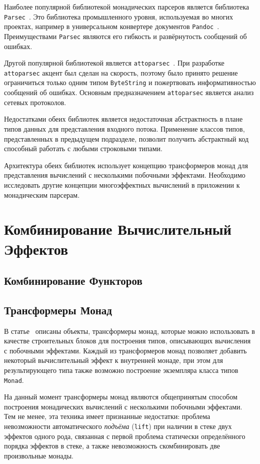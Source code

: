 Наиболее популярной библиотекой монадических парсеров является библиотека \lstinline{Parsec}~\autocite{Parsec}. Это библиотека промышленного уровня, используемая во многих проектах, например в универсальном конвертере документов \lstinline{Pandoc}~\autocite{Pandoc}. Преимуществами \lstinline{Parsec} являются его гибкость и развёрнутость сообщений об ошибках.

Другой популярной библиотекой является \lstinline{attoparsec}~\autocite{Attoparsec}. При разработке \lstinline{attoparsec} акцент был сделан на скорость, поэтому было принято решение ограничиться только одним типом \lstinline{ByteString} и пожертвовать информативностью сообщений об ошибках. Основным предназначением \lstinline{attoparsec} является анализ сетевых протоколов.

Недостатками обеих библиотек является недостаточная абстрактность в плане типов данных для представления входного потока. Применение классов типов, представленных в предыдущем подразделе, позволит получить абстрактный код способный работать с любыми строковыми типами.   

Архитектура обеих библиотек использует концепцию трансформеров монад для представления вычислений с несколькими побочными эффектами. Необходимо исследовать другие концепции многоэффектных вычислений в приложении к монадическим парсерам. 

\section{Комбинирование Вычислительный Эффектов}

\subsection{Комбинирование Функторов}

\subsection{Трансформеры Монад}

В статье~\autocite{MonadTransformers} описаны объекты, трансформеры монад, которые можно использовать в качестве строительных блоков для построения типов, описывающих вычисления с побочными эффектами. Каждый из трансформеров монад позволяет добавить некоторый вычислительный эффект к внутренней монаде, при этом для результирующего типа также возможно построение экземпляра класса типов \lstinline{Monad}.

На данный момент трансформеры монад являются общепринятым способом построения монадических вычислений с несколькими побочными эффектами. Тем не менее, эта техника имеет признанные недостатки: проблема невозможности автоматического \emph{подъёма} (\lstinline{lift}) при наличии в стеке двух эффектов одного рода, связанная с первой проблема статически определённого порядка эффектов в стеке, а также невозможность скомбинировать две произвольные монады. 

